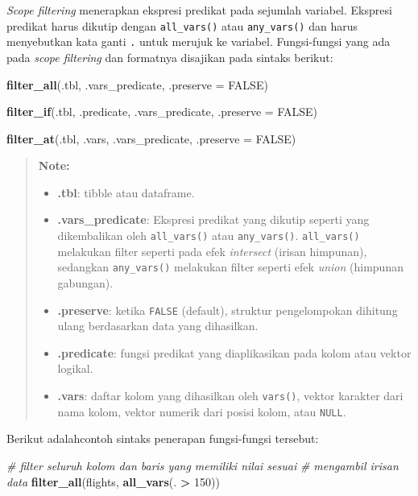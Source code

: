 \documentclass[]{book}
\newenvironment{Shaded}{\begin{snugshade}}{\end{snugshade}}
\newcommand{\KeywordTok}[1]{\textcolor[rgb]{0.13,0.29,0.53}{\textbf{#1}}}
\newcommand{\DataTypeTok}[1]{\textcolor[rgb]{0.13,0.29,0.53}{#1}}
\newcommand{\DecValTok}[1]{\textcolor[rgb]{0.00,0.00,0.81}{#1}}
\newcommand{\StringTok}[1]{\textcolor[rgb]{0.31,0.60,0.02}{#1}}
\newcommand{\CommentTok}[1]{\textcolor[rgb]{0.56,0.35,0.01}{\textit{#1}}}
\newcommand{\OtherTok}[1]{\textcolor[rgb]{0.56,0.35,0.01}{#1}}
\newcommand{\OperatorTok}[1]{\textcolor[rgb]{0.81,0.36,0.00}{\textbf{#1}}}
\newcommand{\NormalTok}[1]{#1}
\providecommand{\tightlist}{%
  \setlength{\itemsep}{0pt}\setlength{\parskip}{0pt}}
\begin{document}
\emph{Scope filtering} menerapkan ekspresi predikat pada sejumlah
variabel. Ekspresi predikat harus dikutip dengan \texttt{all\_vars()}
atau \texttt{any\_vars()} dan harus menyebutkan kata ganti \texttt{.}
untuk merujuk ke variabel. Fungsi-fungsi yang ada pada \emph{scope
filtering} dan formatnya disajikan pada sintaks berikut:

\begin{Shaded}
\begin{Highlighting}[]
\KeywordTok{filter_all}\NormalTok{(.tbl, .vars_predicate, }\DataTypeTok{.preserve =} \OtherTok{FALSE}\NormalTok{)}

\KeywordTok{filter_if}\NormalTok{(.tbl, .predicate, .vars_predicate, }\DataTypeTok{.preserve =} \OtherTok{FALSE}\NormalTok{)}

\KeywordTok{filter_at}\NormalTok{(.tbl, .vars, .vars_predicate, }\DataTypeTok{.preserve =} \OtherTok{FALSE}\NormalTok{)}
\end{Highlighting}
\end{Shaded}

\begin{quote}
\textbf{Note: }

\begin{itemize}
\tightlist
\item
  \textbf{.tbl}: tibble atau dataframe.
\item
  \textbf{.vars\_predicate}: Ekspresi predikat yang dikutip seperti yang
  dikembalikan oleh \texttt{all\_vars()} atau \texttt{any\_vars()}.
  \texttt{all\_vars()} melakukan filter seperti pada efek
  \emph{intersect} (irisan himpunan), sedangkan \texttt{any\_vars()}
  melakukan filter seperti efek \emph{union} (himpunan gabungan).
\item
  \textbf{.preserve}: ketika \texttt{FALSE} (default), struktur
  pengelompokan dihitung ulang berdasarkan data yang dihasilkan.
\item
  \textbf{.predicate}: fungsi predikat yang diaplikasikan pada kolom
  atau vektor logikal.
\item
  \textbf{.vars}: daftar kolom yang dihasilkan oleh \texttt{vars()},
  vektor karakter dari nama kolom, vektor numerik dari posisi kolom,
  atau \texttt{NULL}.
\end{itemize}
\end{quote}

Berikut adalahcontoh sintaks penerapan fungsi-fungsi tersebut:

\begin{Shaded}
\begin{Highlighting}[]
\CommentTok{# filter seluruh kolom dan baris yang memiliki nilai sesuai}
\CommentTok{# mengambil irisan data}
\KeywordTok{filter_all}\NormalTok{(flights, }\KeywordTok{all_vars}\NormalTok{(. }\OperatorTok{>}\StringTok{ }\DecValTok{150}\NormalTok{))}
\end{Highlighting}
\end{Shaded}
\end{document}
